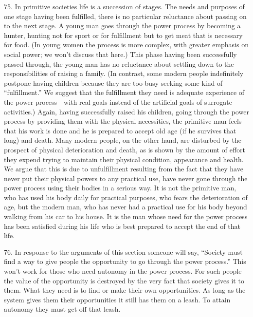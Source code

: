 \documentclass{article}
\begin{document}
75. In primitive societies life is a succession of stages. The needs and purposes of one stage 
having been fulfilled, there is no particular reluctance about passing on to the next stage. A young 
man goes through the power process by becoming a hunter, hunting not for sport or for fulfillment 
but to get meat that is necessary for food. (In young women the process is more complex, with 
greater emphasis on social power; we won’t discuss that here.) This phase having been successfully 
passed through, the young man has no reluctance about settling down to the responsibilities of 
raising a family. (In contrast, some modern people indefinitely postpone having children because 
they are too busy seeking some kind of “fulfillment.” We suggest that the fulfillment they need is 
adequate experience of the power process—with real goals instead of the artificial goals of 
surrogate activities.) Again, having successfully raised his children, going through the power 
process by providing them with the physical necessities, the primitive man feels that his work is 
done and he is prepared to accept old age (if he survives that long) and death. Many modern 
people, on the other hand, are disturbed by the prospect of physical deterioration and death, as is 
shown by the amount of effort they expend trying to maintain their physical condition, appearance 
and health. We argue that this is due to unfulfillment resulting from the fact that they have never 
put their physical powers to any practical use, have never gone through the power process using 
their bodies in a serious way. It is not the primitive man, who has used his body daily for practical 
purposes, who fears the deterioration of age, but the modern man, who has never had a practical 
use for his body beyond walking from his car to his house. It is the man whose need for the power 
process has been satisfied during his life who is best prepared to accept the end of that life. \vspace{\baselineskip}

76. In response to the arguments of this section someone will say, “Society must find a way to 
give people the opportunity to go through the power process.” This won’t work for those who need 
autonomy in the power process. For such people the value of the opportunity is destroyed by the 
very fact that society gives it to them. What they need is to find or make their own 
opportunities. As long as the system gives them their opportunities it still has them on a leash. To 
attain autonomy they must get off that leash. \newpage
\end{document}
